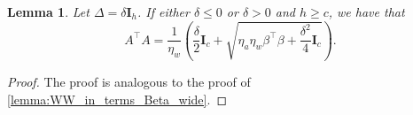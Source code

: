 \documentclass{article}
\theoremstyle{plain}
\newtheorem{lemma}[theorem]{Lemma}
\theoremstyle{definition}
\theoremstyle{remark}
\begin{document}
\begin{lemma}
    \label{lemma:AA_in_terms_Beta_wide}
    Let $\Delta = \delta \mathbf{I}_h$. If either $\delta \leq 0$ or $\delta > 0$ and $h \geq c$, we have that
    \begin{equation}
        A^\intercal A = \frac{1}{\eta_w} \left ( \frac{\delta}{2}\mathbf{I}_c + \sqrt{\eta_a \eta_w \beta^{\intercal}  \beta + \frac{\delta^2}{4}\mathbf{I}_c} \right).
    \end{equation}
\end{lemma}
\begin{proof} 
    The proof is analogous to the proof of \cref{lemma:WW_in_terms_Beta_wide}.
    

\end{proof}
\end{document}

